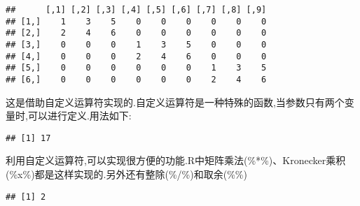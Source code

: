 \documentclass[]{ctexbook}
\newenvironment{Shaded}{\begin{snugshade}}{\end{snugshade}}
\newcommand{\ControlFlowTok}[1]{\textcolor[rgb]{0.13,0.29,0.53}{\textbf{#1}}}
\newcommand{\DecValTok}[1]{\textcolor[rgb]{0.00,0.00,0.81}{#1}}
\newcommand{\KeywordTok}[1]{\textcolor[rgb]{0.13,0.29,0.53}{\textbf{#1}}}
\newcommand{\NormalTok}[1]{#1}
\newcommand{\OperatorTok}[1]{\textcolor[rgb]{0.81,0.36,0.00}{\textbf{#1}}}
\newcommand{\StringTok}[1]{\textcolor[rgb]{0.31,0.60,0.02}{#1}}
\begin{document}
\begin{Shaded}
\end{Shaded}

\begin{verbatim}
##      [,1] [,2] [,3] [,4] [,5] [,6] [,7] [,8] [,9]
## [1,]    1    3    5    0    0    0    0    0    0
## [2,]    2    4    6    0    0    0    0    0    0
## [3,]    0    0    0    1    3    5    0    0    0
## [4,]    0    0    0    2    4    6    0    0    0
## [5,]    0    0    0    0    0    0    1    3    5
## [6,]    0    0    0    0    0    0    2    4    6
\end{verbatim}

这是借助自定义运算符实现的.自定义运算符是一种特殊的函数,当参数只有两个变量时,可以进行定义.用法如下:

\begin{Shaded}
\end{Shaded}

\begin{verbatim}
## [1] 17
\end{verbatim}

利用自定义运算符,可以实现很方便的功能.R中矩阵乘法(\%*\%)、Kronecker乘积(\%x\%)都是这样实现的.另外还有整除(\%/\%)和取余(\%\%)

\begin{Shaded}
\end{Shaded}

\begin{verbatim}
## [1] 2
\end{verbatim}

\begin{Shaded}
\end{Shaded}
\end{document}
